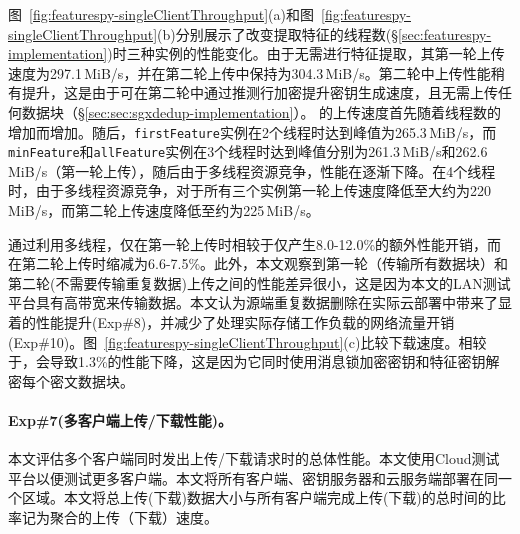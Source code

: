 图~\ref{fig:featurespy-singleClientThroughput}(a)和图~\ref{fig:featurespy-singleClientThroughput}(b)分别展示了改变提取特征的线程数(\S\ref{sec:featurespy-implementation})时\prototype 三种实例的性能变化。由于\sysnameS 无需进行特征提取，其第一轮上传速度为297.1\,MiB/s，并在第二轮上传中保持为304.3\,MiB/s。第二轮中上传性能稍有提升，这是由于\sysnameS 可在第二轮中通过推测行加密提升密钥生成速度，且无需上传任何数据块（\S\ref{sec:sec:sgxdedup-implementation}）。
\prototype 的上传速度首先随着线程数的增加而增加。随后，{\tt firstFeature}实例在2个线程时达到峰值为265.3\,MiB/s，而{\tt minFeature}和{\tt allFeature}实例在3个线程时达到峰值分别为261.3\,MiB/s和262.6\,MiB/s（第一轮上传），随后由于多线程资源竞争，性能在逐渐下降。在4个线程时，由于多线程资源竞争，对于所有三个实例第一轮上传速度降低至大约为220\,MiB/s，而第二轮上传速度降低至约为225\,MiB/s。 

通过利用多线程，\prototype 仅在第一轮上传时相较于\sysnameS 仅产生8.0-12.0\%的额外性能开销，而在第二轮上传时缩减为6.6-7.5\%。此外，本文观察到第一轮（传输所有数据块）和第二轮(不需要传输重复数据)上传之间的性能差异很小，这是因为本文的LAN测试平台具有高带宽来传输数据。本文认为源端重复数据删除在实际云部署中带来了显着的性能提升(Exp\#8)，并减少了处理实际存储工作负载的网络流量开销(Exp\#10)。图~\ref{fig:featurespy-singleClientThroughput}(c)比较下载速度。相较于\sysnameS，\prototype 会导致1.3\%的性能下降，这是因为它同时使用消息锁加密密钥和特征密钥解密每个密文数据块。

\paragraph*{Exp\#7(多客户端上传/下载性能)。}
本文评估多个客户端同时发出上传/下载请求时的总体性能。本文使用Cloud测试平台以便测试更多客户端。本文将所有客户端、密钥服务器和云服务端部署在同一个区域。本文将总上传(下载)数据大小与所有客户端完成上传(下载)的总时间的比率记为聚合的上传（下载）速度。

